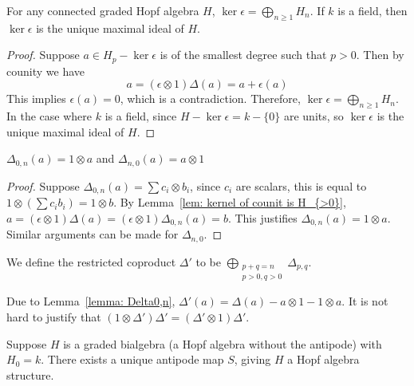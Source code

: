 \begin{lemma}\label{lem: kernel of counit is H_{>0}}
For any connected graded Hopf algebra $H$, $\ker\epsilon=\bigoplus\limits_{n\geq1}H_n$. If $k$ is a field, then $\ker\epsilon$ is the unique maximal ideal of $H$.
\end{lemma}

\begin{proof}
Suppose $a\in H_p-\ker\epsilon$ is of the smallest degree such that $p>0$. Then by counity we have
\[
a=(\epsilon\otimes 1)\Delta(a)=a+\epsilon(a)
\]
This implies $\epsilon(a)=0$, which is a contradiction. Therefore, $\ker\epsilon=\bigoplus\limits_{n\geq1}H_n$. In the case where $k$ is a field, since $H-\ker\epsilon=k-\{0\}$ are units, so $\ker\epsilon$ is the unique maximal ideal of $H$.
\end{proof}

\begin{lemma}\label{lemma: Delta0,n}
$\Delta_{0,n}(a)=1\otimes a$ and $\Delta_{n,0}(a)=a\otimes 1$
\end{lemma}

\begin{proof}
Suppose $\Delta_{0,n}(a)=\sum c_i\otimes b_i$, since $c_i$ are scalars, this is equal to $1\otimes\left(\sum c_ib_i\right)=1\otimes b$. By Lemma~\ref{lem: kernel of counit is H_{>0}}, $a=(\epsilon\otimes1)\Delta(a)=(\epsilon\otimes1)\Delta_{0,n}(a)=b$. This justifies $\Delta_{0,n}(a)=1\otimes a$. Similar arguments can be made for $\Delta_{n,0}$.
\end{proof}

\begin{definition}
We define the restricted coproduct $\Delta'$ to be $\bigoplus\limits_{\substack{p+q=n\\p>0,q>0}}\Delta_{p,q}$.
\end{definition}

Due to Lemma~\ref{lemma: Delta0,n}, $\Delta'(a)=\Delta(a)-a\otimes1-1\otimes a$. It is not hard to justify that $(1\otimes\Delta')\Delta'=(\Delta'\otimes1)\Delta'$.

\begin{theorem}\label{thm: uniqueness of antipode}
Suppose $H$ is a graded bialgebra (a Hopf algebra without the antipode) with $H_0=k$. There exists a unique antipode map $S$, giving $H$ a Hopf algebra structure.
\end{theorem}

